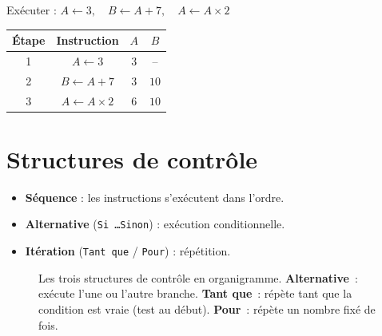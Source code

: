 \begin{ex}
Ex\'ecuter :
$A \leftarrow 3,\quad B \leftarrow A + 7,\quad A \leftarrow A \times 2$

\medskip\centering
\begin{tabular}{cccc}
\toprule
\'Etape & Instruction & $A$ & $B$ \\
\midrule
1 & $A \leftarrow 3$ & $3$ & -- \\
2 & $B \leftarrow A+7$ & $3$ & $10$ \\
3 & $A \leftarrow A \times 2$ & $6$ & $10$ \\
\bottomrule
\end{tabular}
\end{ex}

\section{Structures de contr\^{o}le}

\begin{defn}
\begin{itemize}
  \item \textbf{S\'equence} : les instructions s'ex\'ecutent dans l'ordre.
  \item \textbf{Alternative} (\texttt{Si \ldots Sinon}) : ex\'ecution conditionnelle.
  \item \textbf{It\'eration} (\texttt{Tant que} / \texttt{Pour}) : r\'ep\'etition.
\end{itemize}
\end{defn}

\begin{figure}[H]
\centering

\caption{Les trois structures de contr\^ole en organigramme.
\textbf{Alternative}~: ex\'ecute l'une ou l'autre branche.
\textbf{Tant que}~: r\'ep\`ete tant que la condition est vraie (test au d\'ebut).
\textbf{Pour}~: r\'ep\`ete un nombre fix\'e de fois.}
\end{figure}

